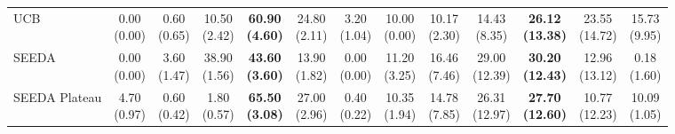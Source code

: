 \begin{table}[H]
{\begin{tabular}{l|cccccc|cccccc}
UCB & \makecell{0.00 \\ (0.00)} & \makecell{0.60 \\ (0.65)} & {\cellcolor[HTML]{C8E6C9}} \makecell{10.50 \\ (2.42)} & \bfseries \makecell{60.90 \\ (4.60)} & \makecell{24.80 \\ (2.11)} & \makecell{3.20 \\ (1.04)} & \makecell{10.00 \\ (0.00)} & \makecell{10.17 \\ (2.30)} & {\cellcolor[HTML]{C8E6C9}} \makecell{14.43 \\ (8.35)} & \bfseries \makecell{26.12 \\ (13.38)} & \makecell{23.55 \\ (14.72)} & \makecell{15.73 \\ (9.95)} \\
SEEDA & \makecell{0.00 \\ (0.00)} & \makecell{3.60 \\ (1.47)} & {\cellcolor[HTML]{C8E6C9}} \makecell{38.90 \\ (1.56)} & \bfseries \makecell{43.60 \\ (3.60)} & \makecell{13.90 \\ (1.82)} & \makecell{0.00 \\ (0.00)} & \makecell{11.20 \\ (3.25)} & \makecell{16.46 \\ (7.46)} & {\cellcolor[HTML]{C8E6C9}} \makecell{29.00 \\ (12.39)} & \bfseries \makecell{30.20 \\ (12.43)} & \makecell{12.96 \\ (13.12)} & \makecell{0.18 \\ (1.60)} \\
SEEDA Plateau & \makecell{4.70 \\ (0.97)} & \makecell{0.60 \\ (0.42)} & {\cellcolor[HTML]{C8E6C9}} \makecell{1.80 \\ (0.57)} & \bfseries \makecell{65.50 \\ (3.08)} & \makecell{27.00 \\ (2.96)} & \makecell{0.40 \\ (0.22)} & \makecell{10.35 \\ (1.94)} & \makecell{14.78 \\ (7.85)} & {\cellcolor[HTML]{C8E6C9}} \makecell{26.31 \\ (12.97)} & \bfseries \makecell{27.70 \\ (12.60)} & \makecell{10.77 \\ (12.23)} & \makecell{10.09 \\ (1.05)} \\
\bottomrule
\end{tabular}%
}
\end{table}
